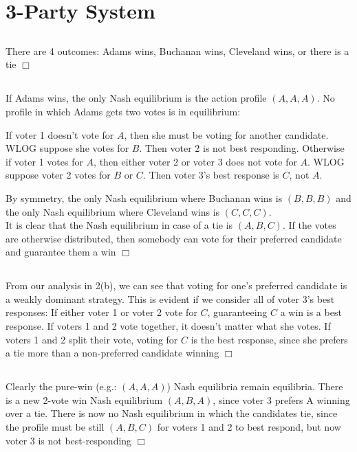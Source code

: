 \documentclass{article}
\newenvironment{myindentpar}[1]
  {\begin{list}{}
          {\setlength{\leftmargin}{#1}}
          \item[]
  }
  {\end{list}}
\begin{document}
\section{3-Party System}
\subsection{}
There are 4 outcomes: Adams wins, Buchanan wins, Cleveland wins, or there is a tie $\Box$
\subsection{}
If Adams wins, the only Nash equilibrium is the action profile $(A,A,A)$. No profile in which Adams gets two votes is in equilibrium:
\begin{myindentpar}{2em}
    If voter 1 doesn't vote for $A$, then she must be voting for another candidate. WLOG suppose she votes for $B$. Then voter 2 is not best responding. Otherwise if voter 1 votes for $A$, then either voter 2 or voter 3 does not vote for $A$. WLOG suppose voter 2 votes for $B$ or $C$. Then voter 3's best response is $C$, not $A$.
\end{myindentpar}
By symmetry, the only Nash equilibrium where Buchanan wins is $(B,B,B)$ and the only Nash equilibrium where Cleveland wins is $(C,C,C)$.\\
It is clear that the Nash equilibrium in case of a tie is $(A,B,C)$. If the votes are otherwise distributed, then somebody can vote for their preferred candidate and guarantee them a win $\Box$
\subsection{}
From our analysis in 2(b), we can see that voting for one's preferred candidate is a weakly dominant strategy. This is evident if we consider all of voter 3's best responses: If either voter 1 or voter 2 vote for $C$, guaranteeing $C$ a win is a best response. If voters 1 and 2 vote together, it doesn't matter what she votes. If voters 1 and 2 split their vote, voting for $C$ is the best response, since she prefers a tie more than a non-preferred candidate winning $\Box$
\subsection{}
Clearly the pure-win (e.g.: $(A,A,A)$) Nash equilibria remain equilibria.
There is a new 2-vote win Nash equilibrium $(A,B,A)$, since voter 3 prefers A winning over a tie.
There is now no Nash equilibrium in which the candidates tie, since the profile must be still $(A,B,C)$ for voters 1 and 2 to best respond, but now voter 3 is not best-responding $\Box$
\end{document}
